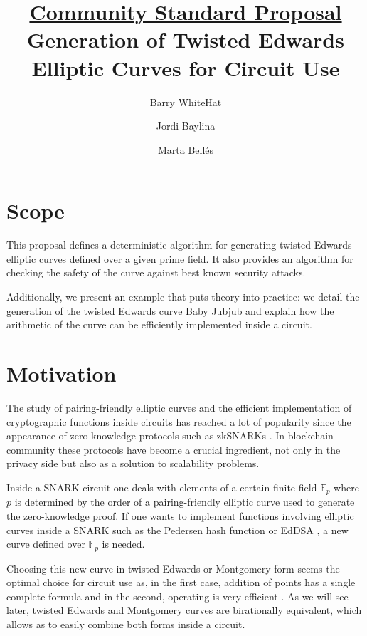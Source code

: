 \documentclass{article}
\title{	\underline{Community Standard Proposal}\\\vspace{0.4cm}
			Generation of Twisted Edwards Elliptic Curves for Circuit Use}
\author[1]{Barry WhiteHat}
\author[2]{Jordi Baylina}
\author[2,3]{Marta Bellés}
\affil[1]{Ethereum foundation}
\affil[2]{iden3}
\affil[3]{Universitat Pompeu Fabra}
\newcommand{\Fp}{\ensuremath{\mathbb{F}_p}}
\theoremstyle{definition}
\theoremstyle{remark}
\begin{document}
\begin{spacing}{1.2}

\maketitle
\tableofcontents  
\newpage 
\begin{multicols}{2}

\section{Scope}
	
This proposal defines a deterministic algorithm for generating twisted Edwards elliptic curves defined over a given prime field. It also provides an algorithm for checking the safety of the curve against best known security attacks. 
	
Additionally, we present an example that puts theory into practice: we detail the generation of the twisted Edwards curve Baby Jubjub and explain how the arithmetic of the curve can be efficiently implemented inside a circuit. 
	
\section{Motivation}
	
The study of pairing-friendly elliptic curves and the efficient implementation of cryptographic  functions inside circuits has reached a lot of popularity since the appearance of zero-knowledge protocols such as zkSNARKs \cite{pinocchio,cryptoeprint:2016:260}. In blockchain community these protocols have become a crucial ingredient, not only in the privacy side but also as a solution to scalability problems. %
	
Inside a SNARK circuit one deals with elements of a certain finite field $\Fp$ where $p$ is determined by the order of a pairing-friendly elliptic curve used to generate the zero-knowledge proof. If one wants to implement functions involving elliptic curves inside a SNARK such as the Pedersen hash function \cite[Sec. 5.4.1.7]{github:zcash:sapling} or EdDSA \cite{eddsa}, a new curve defined over $\Fp$ is needed. 
	
Choosing this new curve in twisted Edwards \cite{cryptoeprint:2008:013} or Montgomery form \cite{Okeya:2000:ECM:648117.746614} seems the optimal choice for circuit use as, in the first case, addition of points has a single complete formula and in the second, operating is very efficient \cite{scaling}. As we will see later, twisted Edwards and Montgomery curves are birationally equivalent, which allows as to easily combine both forms inside a circuit. 


\end{multicols}
\end{spacing}
\end{document}
